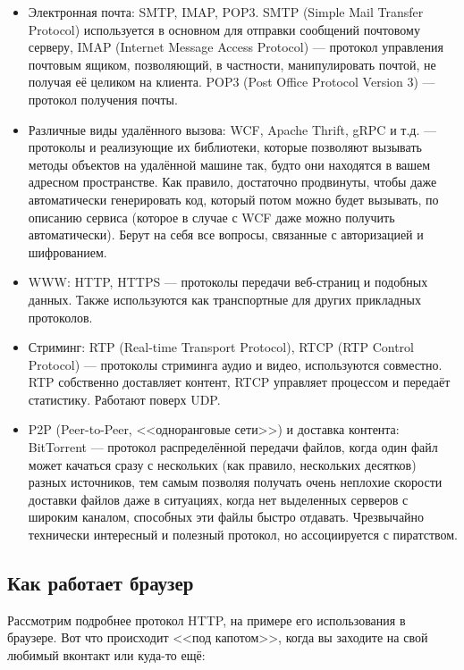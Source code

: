 \documentclass{../../text-style}
\begin{document}
\begin{itemize}
    \item Электронная почта: SMTP, IMAP, POP3. SMTP (Simple Mail Transfer Protocol) используется в основном для отправки сообщений почтовому серверу, IMAP (Internet Message Access Protocol) --- протокол управления почтовым ящиком, позволяющий, в частности, манипулировать почтой, не получая её целиком на клиента. POP3 (Post Office Protocol Version 3) --- протокол получения почты.
    \item Различные виды удалённого вызова: WCF, Apache Thrift, gRPC и т.д. --- протоколы и реализующие их библиотеки, которые позволяют вызывать методы объектов на удалённой машине так, будто они находятся в вашем адресном пространстве. Как правило, достаточно продвинуты, чтобы даже автоматически генерировать код, который потом можно будет вызывать, по описанию сервиса (которое в случае с WCF даже можно получить автоматически). Берут на себя все вопросы, связанные с авторизацией и шифрованием.
    \item WWW: HTTP, HTTPS --- протоколы передачи веб-страниц и подобных данных. Также используются как транспортные для других прикладных протоколов.
    \item Стриминг: RTP (Real-time Transport Protocol), RTCP (RTP Control Protocol) --- протоколы стриминга аудио и видео, используются совместно. RTP собственно доставляет контент, RTCP управляет процессом и передаёт статистику. Работают поверх UDP.
    \item P2P (Peer-to-Peer, <<одноранговые сети>>) и доставка контента: BitTorrent --- протокол распределённой передачи файлов, когда один файл может качаться сразу с нескольких (как правило, нескольких десятков) разных источников, тем самым позволяя получать очень неплохие скорости доставки файлов даже в ситуациях, когда нет выделенных серверов с широким каналом, способных эти файлы быстро отдавать. Чрезвычайно технически интересный и полезный протокол, но ассоциируется с пиратством.
\end{itemize}

\subsection{Как работает браузер}

Рассмотрим подробнее протокол HTTP, на примере его использования в браузере. Вот что происходит <<под капотом>>, когда вы заходите на свой любимый вконтакт или куда-то ещё:
\end{document}
